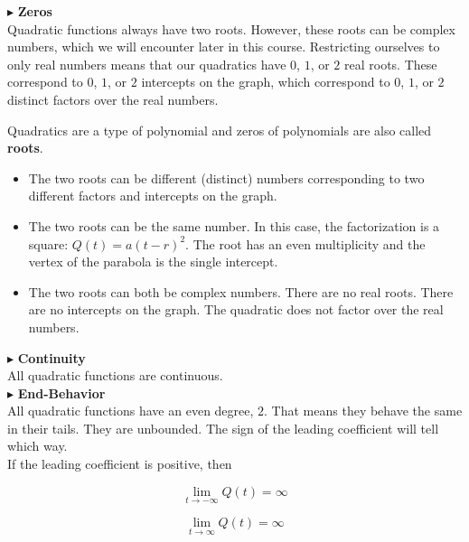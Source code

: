 \documentclass{ximera}
\begin{document}
$\blacktriangleright$ \textbf{\textcolor{red!10!blue!90!}{Zeros}} \\

Quadratic functions always have two roots.  However, these roots can be complex numbers, which we will encounter later in this course.  Restricting ourselves to only real numbers means that our quadratics have $0$, $1$, or $2$ real roots.  These correspond to  $0$, $1$, or $2$ intercepts on the graph, which correspond to $0$, $1$, or $2$ distinct factors over the real numbers. 

Quadratics are a type of polynomial and zeros of polynomials are also called \textbf{roots}.

\begin{itemize}
\item The two roots can be different (distinct) numbers corresponding to two different factors and intercepts on the graph.  
\item The two roots can be the same number.  In this case, the factorization is a square: $Q(t) = a(t-r)^2$.  The root has an even multiplicity and the vertex of the parabola is the single intercept.
\item The two roots can both be complex numbers.  There are no real roots. There are no intercepts on the graph. The quadratic does not factor over the real numbers.
\end{itemize}




$\blacktriangleright$ \textbf{\textcolor{red!10!blue!90!}{Continuity}} \\

All quadratic functions are continuous. \\








$\blacktriangleright$ \textbf{\textcolor{red!10!blue!90!}{End-Behavior}} \\

All quadratic functions have an even degree, $2$.   That means they behave the same in their tails.  They are unbounded.  The sign of the leading coefficient will tell which way. \\


If the leading coefficient is positive, then 


\[
\lim\limits_{t \to -\infty} Q(t) = \infty
\]

\[
\lim\limits_{t \to \infty} Q(t) = \infty
\]
\end{document}
